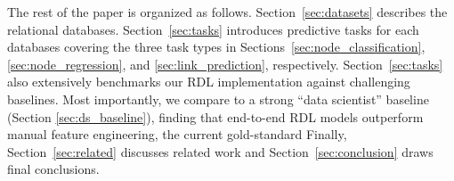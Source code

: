 The rest of the paper is organized as follows. Section~\ref{sec:datasets} describes the \relbench relational databases.
Section~\ref{sec:tasks} introduces predictive tasks for each \relbench databases covering the three task types in Sections~\ref{sec:node_classification}, \ref{sec:node_regression}, and \ref{sec:link_prediction}, respectively.
Section~\ref{sec:tasks} also extensively benchmarks our RDL implementation against challenging baselines. Most importantly, we compare to a strong ``data scientist'' baseline (Section \ref{sec:ds_baseline}), finding that end-to-end RDL models outperform manual feature engineering, the current gold-standard
Finally, Section~\ref{sec:related} discusses related work and  Section~\ref{sec:conclusion} draws final conclusions.




